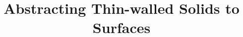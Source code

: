 

\usepackage[disable]{todonotes} %

\title{\huge Abstracting Thin-walled Solids to Surfaces}

\date[]{}
	\def\conference{}
 	\def\yourEmail{kulkarniyh12.mech@coep.ac.in}



